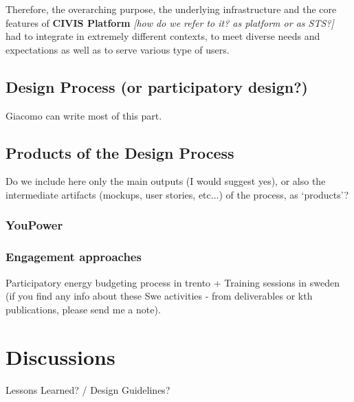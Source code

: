 Therefore, the overarching purpose, the underlying infrastructure and the core features of \textbf{CIVIS Platform} \textit{[how do we refer to it? as platform or as STS?]} had
to integrate in extremely different contexts, to meet diverse needs and expectations as well as to serve various type of users. 

\subsection{Design Process (or participatory design?)}

\begin{svgraybox}
[note by GP] Giacomo can write most of this part. 
\end{svgraybox}


\subsection{Products of the Design Process}
\begin{svgraybox}
[note by GP] Do we include here only the main outputs (I would suggest yes), or also the intermediate artifacts (mockups, user stories, etc...) of the process, as `products'?
\end{svgraybox}

\subsubsection{YouPower}


\subsubsection{Engagement approaches} %
\begin{svgraybox}
[note by GP] Participatory energy budgeting process in trento + Training sessions in sweden (if you find any info about these Swe activities - from deliverables or kth publications, please send me a note).
\end{svgraybox}



\section{Discussions} %

\begin{svgraybox}
Lessons Learned?  / Design Guidelines? 
\end{svgraybox}
